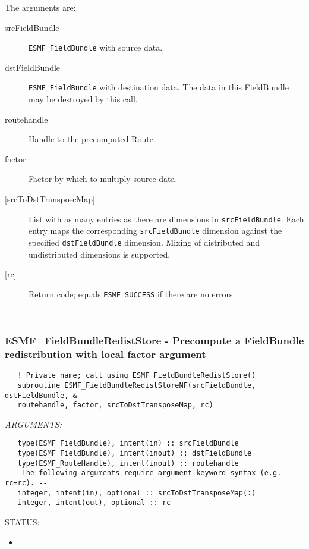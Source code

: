    The arguments are:
   \begin{description}
   \item [srcFieldBundle]
   {\tt ESMF\_FieldBundle} with source data.
   \item [dstFieldBundle]
   {\tt ESMF\_FieldBundle} with destination data. The data in this
   FieldBundle may be destroyed by this call.
   \item [routehandle]
   Handle to the precomputed Route.
   \item [factor]
   Factor by which to multiply source data.
   \item [{[srcToDstTransposeMap]}]
   List with as many entries as there are dimensions in {\tt srcFieldBundle}. Each
   entry maps the corresponding {\tt srcFieldBundle} dimension
   against the specified {\tt dstFieldBundle}
   dimension. Mixing of distributed and undistributed dimensions is supported.
   \item [{[rc]}]
   Return code; equals {\tt ESMF\_SUCCESS} if there are no errors.
   \end{description}
   
 
\mbox{}\hrulefill\ 
 
\subsubsection [ESMF\_FieldBundleRedistStore] {ESMF\_FieldBundleRedistStore - Precompute a FieldBundle redistribution with local factor argument}


  
\begin{verbatim}   ! Private name; call using ESMF_FieldBundleRedistStore()
   subroutine ESMF_FieldBundleRedistStoreNF(srcFieldBundle, dstFieldBundle, &
   routehandle, factor, srcToDstTransposeMap, rc)\end{verbatim}{\em ARGUMENTS:}
\begin{verbatim}   type(ESMF_FieldBundle), intent(in) :: srcFieldBundle
   type(ESMF_FieldBundle), intent(inout) :: dstFieldBundle
   type(ESMF_RouteHandle), intent(inout) :: routehandle
 -- The following arguments require argument keyword syntax (e.g. rc=rc). --
   integer, intent(in), optional :: srcToDstTransposeMap(:)
   integer, intent(out), optional :: rc\end{verbatim}
{\sf STATUS:}
   \begin{itemize}
   \item{}
   \end{itemize}
  
